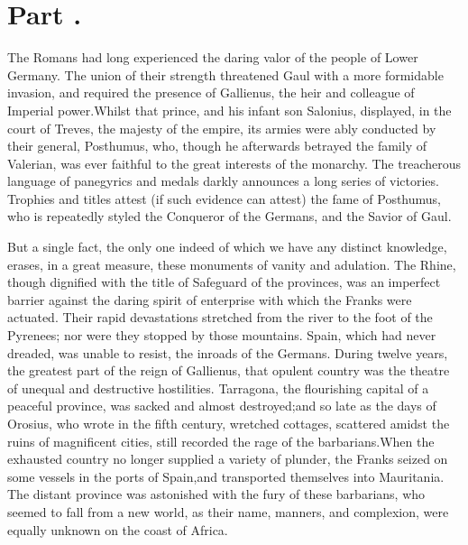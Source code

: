 \section{Part \thesection.}
\thispagestyle{simple}

The Romans had long experienced the daring valor of the people of
Lower Germany. The union of their strength threatened Gaul with a
more formidable invasion, and required the presence of Gallienus,
the heir and colleague of Imperial power.\footnotemark[75] Whilst that prince,
and his infant son Salonius, displayed, in the court of Treves,
the majesty of the empire, its armies were ably conducted by
their general, Posthumus, who, though he afterwards betrayed the
family of Valerian, was ever faithful to the great interests of
the monarchy. The treacherous language of panegyrics and medals
darkly announces a long series of victories. Trophies and titles
attest (if such evidence can attest) the fame of Posthumus, who
is repeatedly styled the Conqueror of the Germans, and the Savior
of Gaul.\footnotemark[76]



But a single fact, the only one indeed of which we have any
distinct knowledge, erases, in a great measure, these monuments
of vanity and adulation. The Rhine, though dignified with the
title of Safeguard of the provinces, was an imperfect barrier
against the daring spirit of enterprise with which the Franks
were actuated. Their rapid devastations stretched from the river
to the foot of the Pyrenees; nor were they stopped by those
mountains. Spain, which had never dreaded, was unable to resist,
the inroads of the Germans. During twelve years, the greatest
part of the reign of Gallienus, that opulent country was the
theatre of unequal and destructive hostilities. Tarragona, the
flourishing capital of a peaceful province, was sacked and almost
destroyed;\footnotemark[77] and so late as the days of Orosius, who wrote in
the fifth century, wretched cottages, scattered amidst the ruins
of magnificent cities, still recorded the rage of the barbarians.\footnotemark[78]
When the exhausted country no longer supplied a variety of
plunder, the Franks seized on some vessels in the ports of Spain,\footnotemark[79]
and transported themselves into Mauritania. The distant
province was astonished with the fury of these barbarians, who
seemed to fall from a new world, as their name, manners, and
complexion, were equally unknown on the coast of Africa.\footnotemark[80]

